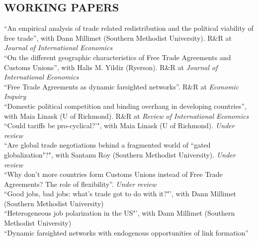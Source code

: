 \documentclass[11pt]{res}
\begin{document}
\begin{resume}
\section{WORKING PAPERS}\vspace{1.5mm}
{``An empirical analysis of trade related redistribution and the political viability of free trade''}, with Dann Millimet (Southern Methodist University). R\&R at \emph{Journal of International Economics}\vspace{1.5mm}\\
{``On the different geographic characteristics of Free Trade Agreements and Customs Unions''}, with Halis M. Yildiz (Ryerson). R\&R at \emph{Journal of International Economics}\vspace{1.5mm}\\
{ ``Free Trade Agreements as dynamic farsighted networks''}. R\&R at \emph{Economic Inquiry} \vspace{1.5mm}\\
{``Domestic political competition and binding overhang in developing countries''}, with Maia Linask (U of Richmond). R\&R at \emph{Review of International Economics}\vspace{1.5mm}\\
{``Could tariffs be pro-cyclical?'"}, with Maia Linask (U of Richmond). \emph{Under review}\vspace{1.5mm}\\


\phantom{.}\vspace{.05cm}
{``Are global trade negotiations behind a fragmented world of ``gated globalization"?"}, with Santanu Roy (Southern Methodist University). \emph{Under review}\vspace{1.5mm}\\
{``Why don't more countries form Customs Unions instead of Free Trade Agreements? The role of flexibility''}.\emph{ Under review} \vspace{1.5mm}\\
{``Good jobs, bad jobs: what's trade got to do with it?"'}, with Dann Millimet (Southern Methodist University)\vspace{1.5mm}\\
{``Heterogeneous job polarization in the US"'}, with Dann Millimet (Southern Methodist University)\vspace{1.5mm}\\
{ ``Dynamic farsighted networks with endogenous opportunities of link formation''} \vspace{1.5mm}\\


\end{resume}
\end{document}
